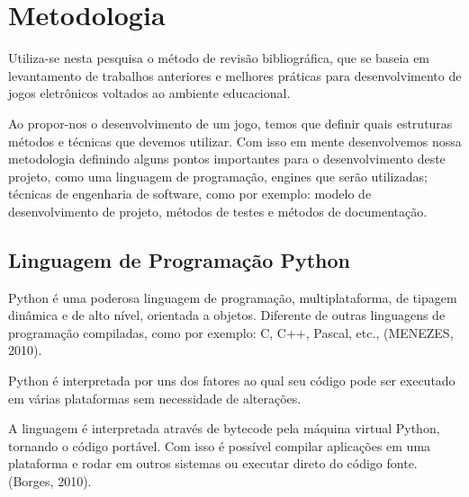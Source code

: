 
\chapter{Metodologia}

Utiliza-se nesta pesquisa o método de revisão bibliográfica, que se baseia em levantamento de trabalhos anteriores e melhores práticas para desenvolvimento de jogos eletrônicos voltados ao ambiente educacional.

Ao propor-nos o desenvolvimento de um jogo, temos que definir quais estruturas métodos e técnicas que devemos utilizar. Com isso em mente desenvolvemos nossa metodologia definindo alguns pontos importantes para o desenvolvimento deste projeto, como uma linguagem de programação, engines que serão utilizadas; técnicas de engenharia de software, como por exemplo: modelo de desenvolvimento de projeto, métodos de testes e métodos de documentação.

\section{Linguagem de Programação Python}

Python é uma poderosa linguagem de programação, multiplataforma, de tipagem dinâmica e de alto nível, orientada a objetos. Diferente de outras linguagens de programação compiladas, como por exemplo: C, C++, Pascal, etc., (MENEZES, 2010).

Python é interpretada por uns dos fatores ao qual seu código pode ser executado em várias plataformas sem necessidade de alterações.

A linguagem é interpretada através de bytecode pela máquina virtual Python, tornando o código portável. Com isso é possível compilar aplicações em uma plataforma e rodar em outros sistemas ou executar direto do código fonte. (Borges, 2010).

